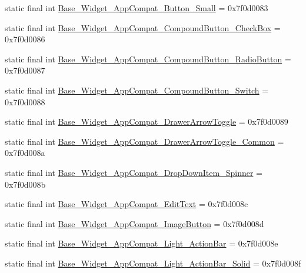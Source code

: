 \begin{DoxyCompactItemize}
\item 
static final int \mbox{\hyperlink{classandroid_1_1support_1_1design_1_1R_1_1style_af4fe17666ae12ade0cc5dccc4e73d81c}{Base\+\_\+\+Widget\+\_\+\+App\+Compat\+\_\+\+Button\+\_\+\+Small}} = 0x7f0d0083
\item 
static final int \mbox{\hyperlink{classandroid_1_1support_1_1design_1_1R_1_1style_a5a7e703fc8df208a54098fb7c9b33df3}{Base\+\_\+\+Widget\+\_\+\+App\+Compat\+\_\+\+Compound\+Button\+\_\+\+Check\+Box}} = 0x7f0d0086
\item 
static final int \mbox{\hyperlink{classandroid_1_1support_1_1design_1_1R_1_1style_ab596edf2643e391425f1a469e69ce390}{Base\+\_\+\+Widget\+\_\+\+App\+Compat\+\_\+\+Compound\+Button\+\_\+\+Radio\+Button}} = 0x7f0d0087
\item 
static final int \mbox{\hyperlink{classandroid_1_1support_1_1design_1_1R_1_1style_ad527149587e3b47f9834113f439d22c2}{Base\+\_\+\+Widget\+\_\+\+App\+Compat\+\_\+\+Compound\+Button\+\_\+\+Switch}} = 0x7f0d0088
\item 
static final int \mbox{\hyperlink{classandroid_1_1support_1_1design_1_1R_1_1style_a457e1838a15856d10a8d12c916773ba4}{Base\+\_\+\+Widget\+\_\+\+App\+Compat\+\_\+\+Drawer\+Arrow\+Toggle}} = 0x7f0d0089
\item 
static final int \mbox{\hyperlink{classandroid_1_1support_1_1design_1_1R_1_1style_a93cedb930ccfa6cadef1eb29de1a73b7}{Base\+\_\+\+Widget\+\_\+\+App\+Compat\+\_\+\+Drawer\+Arrow\+Toggle\+\_\+\+Common}} = 0x7f0d008a
\item 
static final int \mbox{\hyperlink{classandroid_1_1support_1_1design_1_1R_1_1style_ac59d3c95c31fbc0c8a6c60261592935e}{Base\+\_\+\+Widget\+\_\+\+App\+Compat\+\_\+\+Drop\+Down\+Item\+\_\+\+Spinner}} = 0x7f0d008b
\item 
static final int \mbox{\hyperlink{classandroid_1_1support_1_1design_1_1R_1_1style_ac849b9e899a3938f5c47c1e3c4d9d907}{Base\+\_\+\+Widget\+\_\+\+App\+Compat\+\_\+\+Edit\+Text}} = 0x7f0d008c
\item 
static final int \mbox{\hyperlink{classandroid_1_1support_1_1design_1_1R_1_1style_a8cde79b859ab01b253a85b63a48d06d8}{Base\+\_\+\+Widget\+\_\+\+App\+Compat\+\_\+\+Image\+Button}} = 0x7f0d008d
\item 
static final int \mbox{\hyperlink{classandroid_1_1support_1_1design_1_1R_1_1style_af936e54423ddc9b9176aef1004342be3}{Base\+\_\+\+Widget\+\_\+\+App\+Compat\+\_\+\+Light\+\_\+\+Action\+Bar}} = 0x7f0d008e
\item 
static final int \mbox{\hyperlink{classandroid_1_1support_1_1design_1_1R_1_1style_a9360c0e55ae8bf9ef5b45cec4d1ccb6c}{Base\+\_\+\+Widget\+\_\+\+App\+Compat\+\_\+\+Light\+\_\+\+Action\+Bar\+\_\+\+Solid}} = 0x7f0d008f

\end{DoxyCompactItemize}
